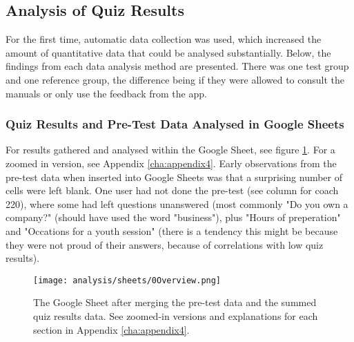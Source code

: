 \subsection{Analysis of Quiz Results}






For the first time, automatic data collection was used, which increased the amount of quantitative data that could be analysed substantially. Below, the findings from each data analysis method are presented. There was one test group and one reference group, the difference being if they were allowed to consult the manuals or only use the feedback from the app.

\subsubsection{Quiz Results and Pre-Test Data Analysed in Google Sheets}
For results gathered and analysed within the Google Sheet, see figure \ref{fig:analysFarg3}. For a zoomed in version, see Appendix \ref{cha:appendix4}. Early observations from the pre-test data when inserted into Google Sheets was that a surprising number of cells were left blank. One user had not done the pre-test (see column for coach 220), where some had left questions unanswered (most commonly "Do you own a company?" (should have used the word "business"), plus "Hours of preperation" and "Occations for a youth session" (there is a tendency this might be because they were not proud of their answers, because of correlations with low quiz results).

\begin{figure}[h]
    \centering
    \texttt{[image: analysis/sheets/0Overview.png]}
    \caption{The Google Sheet after merging the pre-test data and the summed quiz results data. See zoomed-in versions and explanations for each section in Appendix \ref{cha:appendix4}.}
    \label{fig:analysFarg3}
\end{figure}


